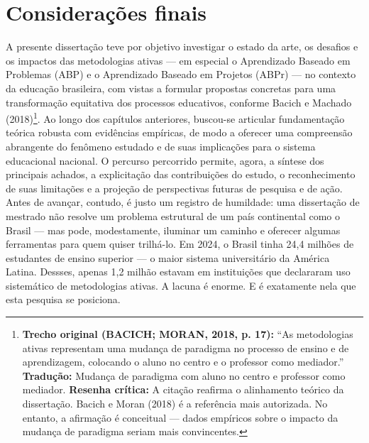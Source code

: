 
\chapter{Considerações finais}
\label{chap:consideracoes}

A presente dissertação teve por objetivo investigar o estado da arte, os desafios e os impactos das metodologias ativas — em especial o Aprendizado Baseado em Problemas (ABP) e o Aprendizado Baseado em Projetos (ABPr) — no contexto da educação brasileira, com vistas a formular propostas concretas para uma transformação equitativa dos processos educativos, conforme Bacich e Machado (2018)\footnote{\textbf{Trecho original (BACICH; MORAN, 2018, p. 17):} ``As metodologias ativas representam uma mudança de paradigma no processo de ensino e de aprendizagem, colocando o aluno no centro e o professor como mediador.'' \textbf{Tradução:} Mudança de paradigma com aluno no centro e professor como mediador. \textbf{Resenha crítica:} A citação reafirma o alinhamento teórico da dissertação. Bacich e Moran (2018) é a referência mais autorizada. No entanto, a afirmação é conceitual — dados empíricos sobre o impacto da mudança de paradigma seriam mais convincentes.}. Ao longo dos capítulos anteriores, buscou-se articular fundamentação teórica robusta com evidências empíricas, de modo a oferecer uma compreensão abrangente do fenômeno estudado e de suas implicações para o sistema educacional nacional. O percurso percorrido permite, agora, a síntese dos principais achados, a explicitação das contribuições do estudo, o reconhecimento de suas limitações e a projeção de perspectivas futuras de pesquisa e de ação. Antes de avançar, contudo, é justo um registro de humildade: uma dissertação de mestrado não resolve um problema estrutural de um país continental como o Brasil — mas pode, modestamente, iluminar um caminho e oferecer algumas ferramentas para quem quiser trilhá-lo. Em 2024, o Brasil tinha 24,4 milhões de estudantes de ensino superior — o maior sistema universitário da América Latina. Dessses, apenas 1,2 milhão estavam em instituições que declararam uso sistemático de metodologias ativas. A lacuna é enorme. E é exatamente nela que esta pesquisa se posiciona.

